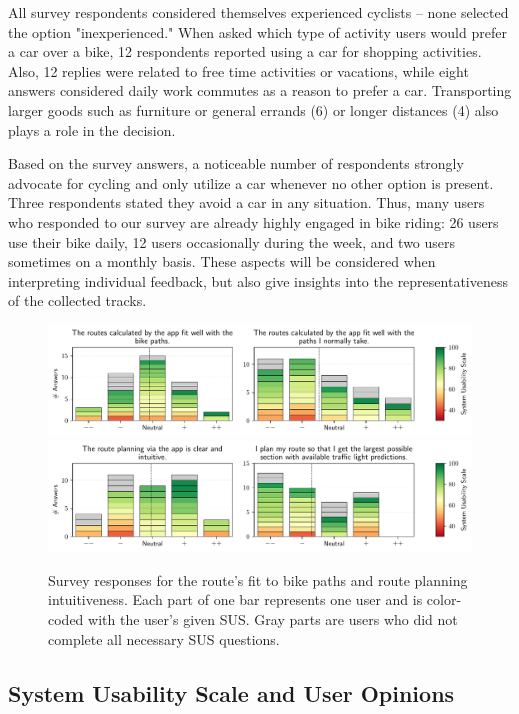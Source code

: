 All survey respondents considered themselves experienced cyclists -- none selected the option "inexperienced." When asked which type of activity users would prefer a car over a bike, 12 respondents reported using a car for shopping activities. Also, 12 replies were related to free time activities or vacations, while eight answers considered daily work commutes as a reason to prefer a car. Transporting larger goods such as furniture or general errands (6) or longer distances (4) also plays a role in the decision. 

Based on the survey answers, a noticeable number of respondents strongly advocate for cycling and only utilize a car whenever no other option is present. Three respondents stated they avoid a car in any situation. Thus, many users who responded to our survey are already highly engaged in bike riding: 26 users use their bike daily, 12 users occasionally during the week, and two users sometimes on a monthly basis. These aspects will be considered when interpreting individual feedback, but also give insights into the representativeness of the collected tracks.

\begin{figure}[!b]
\caption{Survey responses for the route's fit to bike paths and route planning intuitiveness. Each part of one bar represents one user and is color-coded with the user's given SUS. Gray parts are users who did not complete all necessary SUS questions.}\label{fig:route-fit-bike-paths}
\includegraphics[width=\linewidth]{images/app-usability-questions-route-fit-bike-paths.pdf}
\\
\includegraphics[width=\linewidth]{images/app-usability-questions-route-planning-intuitiveness.pdf}
\end{figure}

\subsection{System Usability Scale and User Opinions}

